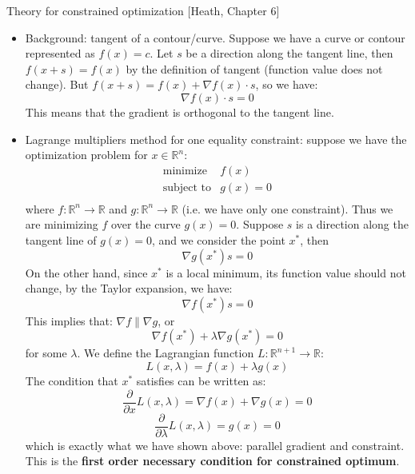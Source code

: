 \documentclass{report}
\begin{document}
Theory for constrained optimization [Heath, Chapter 6]
\begin{itemize}
	\item Background: tangent of a contour/curve. Suppose we have a curve or contour represented as $f(x) = c$. Let $s$ be a direction along the tangent line, then $f(x+s) = f(x)$ by the definition of tangent (function value does not change). But $f(x+s) = f(x) + \nabla f(x) \cdot s$, so we have: 
	\begin{equation}
	\nabla f(x) \cdot s = 0
	\end{equation}
	This means that the gradient is orthogonal to the tangent line. 
	
	\item Lagrange multipliers method for one equality constraint: suppose we have the optimization problem for $x \in \mathbb{R}^n$: 
	\begin{equation}
	\begin{array}{ll}
	\text{minimize} & f(x) \\
	\text{subject to} & g(x) = 0 \\
	\end{array}
	\end{equation}
	where $f: \mathbb{R}^n \to \mathbb{R}$ and $g: \mathbb{R}^n \to \mathbb{R}$ (i.e. we have only one constraint). Thus we are minimizing $f$ over the curve $g(x) = 0$. Suppose $s$ is a direction along the tangent line of $g(x) = 0$, and we consider the point $x^*$, then 
	\begin{equation}
	\nabla g(x^*) s = 0
	\end{equation}
	On the other hand, since $x^*$ is a local minimum, its function value should not change, by the Taylor expansion, we have: 
	\begin{equation}
	\nabla f(x^*) s = 0
	\end{equation}
	This implies that: $\nabla f \parallel \nabla g$, or 
	\begin{equation}
	\nabla f(x^*) + \lambda \nabla g(x^*) = 0 	
	\end{equation}
	for some $\lambda$. We define the Lagrangian function $L: \mathbb{R}^{n+1} \to \mathbb{R}$: 
	\begin{equation}
	L(x,\lambda) = f(x) + \lambda g(x)
	\end{equation}
	The condition that $x^*$ satisfies can be written as: 
	\begin{equation}
	\frac{\partial}{\partial x}L(x,\lambda) = \nabla f(x) + \nabla g(x) = 0
	\end{equation}
	\begin{equation}
	\frac{\partial}{\partial \lambda}L(x,\lambda) = g(x) = 0	
	\end{equation}
	which is exactly what we have shown above: parallel gradient and constraint. This is the \textbf{first order necessary condition for constrained optimum}. 
	

\end{itemize}
\end{document}
